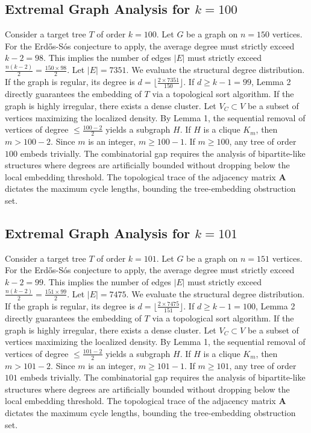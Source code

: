 \documentclass[11pt,a4paper]{article}
\begin{document}
\subsection{Extremal Graph Analysis for $k=100$}
Consider a target tree $T$ of order $k=100$.
Let $G$ be a graph on $n=150$ vertices.
For the Erd\H{o}s-S\'os conjecture to apply, the average degree must strictly exceed $k-2 = 98$.
This implies the number of edges $|E|$ must strictly exceed $\frac{n(k-2)}{2} = \frac{150 \times 98}{2}$.
Let $|E| = 7351$.
We evaluate the structural degree distribution. If the graph is regular, its degree is $d = \lfloor \frac{2 \times 7351}{150} \rfloor$.
If $d \geq k-1 = 99$, Lemma 2 directly guarantees the embedding of $T$ via a topological sort algorithm.
If the graph is highly irregular, there exists a dense cluster. Let $V_C \subset V$ be a subset of vertices maximizing the localized density.
By Lemma 1, the sequential removal of vertices of degree $\leq \frac{100-2}{2}$ yields a subgraph $H$.
If $H$ is a clique $K_{m}$, then $m > 100-2$. Since $m$ is an integer, $m \geq 100-1$. If $m \geq 100$, any tree of order $100$ embeds trivially.
The combinatorial gap requires the analysis of bipartite-like structures where degrees are artificially bounded without dropping below the local embedding threshold. The topological trace of the adjacency matrix $\mathbf{A}$ dictates the maximum cycle lengths, bounding the tree-embedding obstruction set.


\subsection{Extremal Graph Analysis for $k=101$}
Consider a target tree $T$ of order $k=101$.
Let $G$ be a graph on $n=151$ vertices.
For the Erd\H{o}s-S\'os conjecture to apply, the average degree must strictly exceed $k-2 = 99$.
This implies the number of edges $|E|$ must strictly exceed $\frac{n(k-2)}{2} = \frac{151 \times 99}{2}$.
Let $|E| = 7475$.
We evaluate the structural degree distribution. If the graph is regular, its degree is $d = \lfloor \frac{2 \times 7475}{151} \rfloor$.
If $d \geq k-1 = 100$, Lemma 2 directly guarantees the embedding of $T$ via a topological sort algorithm.
If the graph is highly irregular, there exists a dense cluster. Let $V_C \subset V$ be a subset of vertices maximizing the localized density.
By Lemma 1, the sequential removal of vertices of degree $\leq \frac{101-2}{2}$ yields a subgraph $H$.
If $H$ is a clique $K_{m}$, then $m > 101-2$. Since $m$ is an integer, $m \geq 101-1$. If $m \geq 101$, any tree of order $101$ embeds trivially.
The combinatorial gap requires the analysis of bipartite-like structures where degrees are artificially bounded without dropping below the local embedding threshold. The topological trace of the adjacency matrix $\mathbf{A}$ dictates the maximum cycle lengths, bounding the tree-embedding obstruction set.
\end{document}
